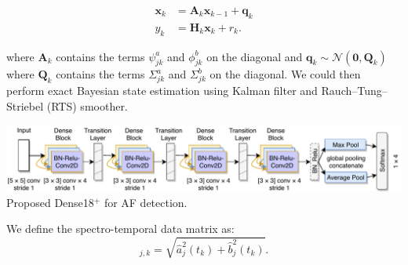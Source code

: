 \documentclass[portrait,a0,final]{a0poster} %
\newcommand{\figurespace}{10mm} %
\begin{document}
\begin{minipage}{0.98\linewidth}
\begin{minipage}[t]{0.47\linewidth}
\begin{equation}
\begin{split}
\mathbf{x}_k &= \mathbf{A}_{k} \mathbf{x}_{k-1} + \mathbf{q}_{k} \\
y_k &= \mathbf{H}_k \mathbf{x}_k + r_k.
\end{split}
\label{eq:dynmodel}
\end{equation}

where $\mathbf{A}_k$ contains the terms $\psi^a_{jk}$ and $\phi^b_{jk}$ on the diagonal and $ \mathbf{q}_{k} \sim \mathcal{N}(\mathbf{0},\mathbf{Q}_k)$ where $\mathbf{Q}_k$ contains the terms $\Sigma^a_{jk}$ and $\Sigma^b_{jk}$ on the diagonal. We could then perform exact Bayesian state estimation using Kalman filter and Rauch–Tung–Striebel (RTS) smoother. 

\vspace{\figurespace}
\includegraphics[scale=1.8]{figures/densely_banner}
\large
\centering
Proposed Dense18$^+$ for AF detection.
\end{minipage} %
\hspace{0.03\linewidth} %
\begin{minipage}[t]{0.47\linewidth}
\Large

We define the spectro-temporal data matrix as:
\begin{equation}
[\mathbf{S}]_{j,k} = \sqrt{\hat{a}_{j}^2(t_k) + \hat{b}_{j}^2(t_k)}.
\label{eq:power_density}
\end{equation}


\end{minipage}
\end{minipage}
\end{document}
